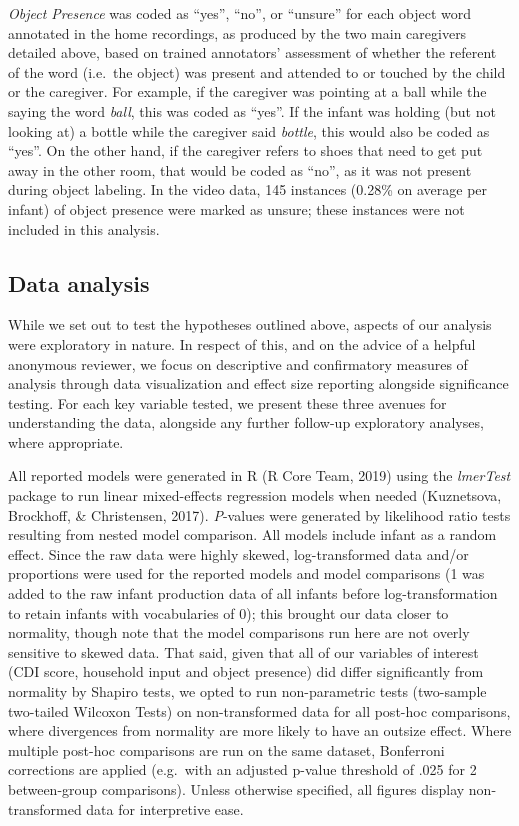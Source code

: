 \documentclass[
  man,floatsintext]{apa6}
\begin{document}
\emph{Object Presence} was coded as ``yes'', ``no'', or ``unsure'' for each object word annotated in the home recordings, as produced by the two main caregivers detailed above, based on trained annotators' assessment of whether the referent of the word (i.e.~the object) was present and attended to or touched by the child or the caregiver. For example, if the caregiver was pointing at a ball while the saying the word \emph{ball}, this was coded as ``yes''. If the infant was holding (but not looking at) a bottle while the caregiver said \emph{bottle}, this would also be coded as ``yes''. On the other hand, if the caregiver refers to shoes that need to get put away in the other room, that would be coded as ``no'', as it was not present during object labeling. In the video data, 145 instances (0.28\% on average per infant) of object presence were marked as unsure; these instances were not included in this analysis.

\hypertarget{data-analysis}{%
\subsection{Data analysis}\label{data-analysis}}

While we set out to test the hypotheses outlined above, aspects of our analysis were exploratory in nature. In respect of this, and on the advice of a helpful anonymous reviewer, we focus on descriptive and confirmatory measures of analysis through data visualization and effect size reporting alongside significance testing. For each key variable tested, we present these three avenues for understanding the data, alongside any further follow-up exploratory analyses, where appropriate.

All reported models were generated in R (R Core Team, 2019) using the \emph{lmerTest} package to run linear mixed-effects regression models when needed (Kuznetsova, Brockhoff, \& Christensen, 2017). \emph{P}-values were generated by likelihood ratio tests resulting from nested model comparison. All models include infant as a random effect. Since the raw data were highly skewed, log-transformed data and/or proportions were used for the reported models and model comparisons (1 was added to the raw infant production data of all infants before log-transformation to retain infants with vocabularies of 0); this brought our data closer to normality, though note that the model comparisons run here are not overly sensitive to skewed data. That said, given that all of our variables of interest (CDI score, household input and object presence) did differ significantly from normality by Shapiro tests, we opted to run non-parametric tests (two-sample two-tailed Wilcoxon Tests) on non-transformed data for all post-hoc comparisons, where divergences from normality are more likely to have an outsize effect. Where multiple post-hoc comparisons are run on the same dataset, Bonferroni corrections are applied (e.g.~with an adjusted p-value threshold of .025 for 2 between-group comparisons). Unless otherwise specified, all figures display non-transformed data for interpretive ease.
\end{document}
